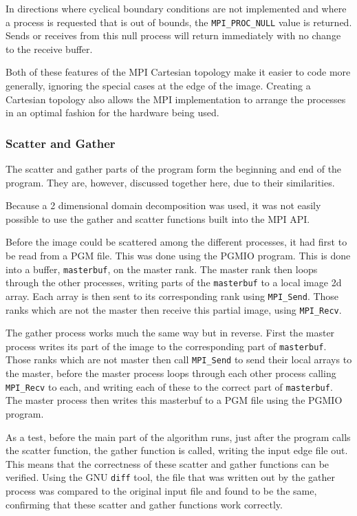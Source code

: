 \documentclass[a4paper,12pt]{article}
\begin{document}
In directions where cyclical boundary conditions are not implemented and where a process is requested that is out of bounds, the \verb|MPI_PROC_NULL| value is returned. Sends or receives from this null process will return immediately with no change to the receive buffer.

Both of these features of the MPI Cartesian topology make it easier to code more generally, ignoring the special cases at the edge of the image. Creating a Cartesian topology also allows the MPI implementation to arrange the processes in an optimal fashion for the hardware being used.

 
\subsubsection{Scatter and Gather}
\label{scatter_gather}
The scatter and gather parts of the program form the beginning and end of the program. They are, however, discussed together here, due to their similarities.

Because a 2 dimensional domain decomposition was used, it was not easily possible to use the gather and scatter functions built into the MPI API.

Before the image could be scattered among the different processes, it had first to be read from a PGM file. This was done using the PGMIO program. This is done into a buffer, \verb|masterbuf|, on the master rank. The master rank then loops through the other processes, writing parts of the \verb|masterbuf| to a local image 2d array. Each array is then sent to its corresponding rank using \verb|MPI_Send|. Those ranks which are not the master then receive this partial image, using \verb|MPI_Recv|.

The gather process works much the same way but in reverse. First the master process writes its part of the image to the corresponding part of \verb|masterbuf|. Those ranks which are not master then call \verb|MPI_Send| to send their local arrays to the master, before the master process loops through each other process calling \verb|MPI_Recv| to each, and writing each of these to the correct part of \verb|masterbuf|. The master process then writes this masterbuf to a PGM file using the PGMIO program.

As a test, before the main part of the algorithm runs, just after the program calls the scatter function, the gather function is called, writing the input edge file out. This means that the correctness of these scatter and gather functions can be verified. Using the GNU \verb|diff| tool, the file that was written out by the gather process was compared to the original input file and found to be the same, confirming that these scatter and gather functions work correctly.
\end{document}
